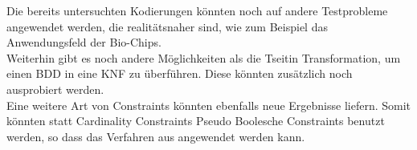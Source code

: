 \documentclass[a4,abstract=on]{scrartcl}
\begin{document}
Die bereits untersuchten Kodierungen könnten noch auf andere Testprobleme angewendet werden, die realitätsnaher sind, wie zum Beispiel das Anwendungsfeld der Bio-Chips.\\
Weiterhin gibt es noch andere Möglichkeiten als die Tseitin Transformation, um einen BDD in eine KNF zu überführen. Diese könnten zusätzlich noch ausprobiert werden.\\
Eine weitere Art von Constraints könnten ebenfalls neue Ergebnisse liefern. Somit könnten statt Cardinality Constraints Pseudo Boolesche Constraints benutzt werden, so dass das Verfahren aus \cite[][Seite 15,16]{niklasse} angewendet werden kann.




\end{document}
